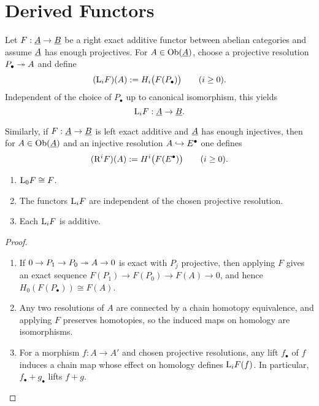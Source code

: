 \section{Derived Functors}

\begin{definition*}
	Let \( F: \underline{A} \to \underline{B} \) be a right exact additive functor between abelian categories and assume \( \underline{A} \) has enough projectives. For \( A \in \operatorname{Ob}(\underline{A}) \), choose a projective resolution \( P_\bullet \twoheadrightarrow A \) and define
	\[
		(\mathrm{L}_i F)(A) := H_i\bigl(F(P_\bullet)\bigr) \qquad (i \ge 0).
	\]
	Independent of the choice of \( P_\bullet \) up to canonical isomorphism, this yields 
	\[
		\mathrm{L}_i F: \underline{A} \to \underline{B}.
	\]
\end{definition*}

\begin{definition*}
	Similarly, if \( F: \underline{A} \to \underline{B} \) is left exact additive and \( \underline{A} \) has enough injectives, then for \( A \in \operatorname{Ob}(\underline{A}) \) and an injective resolution \( A \hookrightarrow E^\bullet \) one defines 
	\[
		(\mathrm{R}^i F)(A) := H^i\bigl(F(E^\bullet)\bigr) \qquad (i \ge 0).
	\]
\end{definition*}

\begin{proposition*}
	\mbox{}
	\begin{enumerate}
		\item \( \mathrm{L}_0 F \cong F \).
		\item The functors \( \mathrm{L}_i F \) are independent of the chosen projective resolution.
		\item Each \( \mathrm{L}_i F \) is additive.
	\end{enumerate}
\end{proposition*}
\begin{proof}
	\mbox{}
	\begin{enumerate}
		\item If \( 0 \to P_1 \to P_0 \twoheadrightarrow A \to 0 \) is exact with \( P_j \) projective, then applying \( F \) gives an exact sequence \( F(P_1) \to F(P_0) \to F(A) \to 0 \), and hence \( H_0(F(P_\bullet)) \cong F(A) \).
		\item Any two resolutions of \( A \) are connected by a chain homotopy equivalence, and applying \( F \) preserves homotopies, so the induced maps on homology are isomorphisms.
		\item For a morphism \( f: A \to A' \) and chosen projective resolutions, any lift \( f_\bullet \)  of \( f \) induces a chain map whose effect on homology defines \( \mathrm{L}_i F(f) \). In particular, \( f_\bullet + g_\bullet \) lifts \( f + g \).
	\end{enumerate}
\end{proof}

